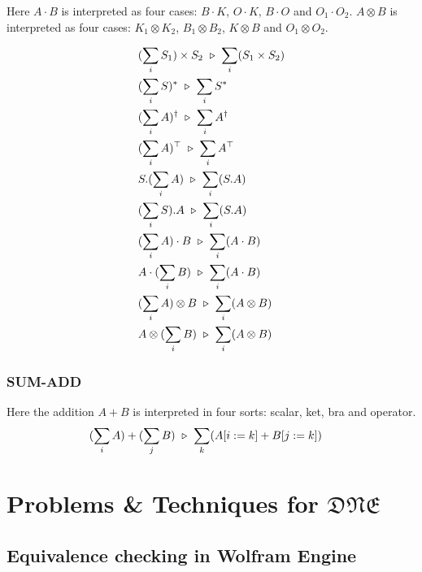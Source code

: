 Here $A \cdot B$ is interpreted as four cases: $B \cdot K$, $O \cdot K$, $B \cdot O$ and $O_1 \cdot O_2$. $A \otimes B$ is interpreted as four cases: $K_1 \otimes K_2$, $B_1 \otimes B_2$, $K \otimes B$ and $O_1 \otimes O_2$.

\begin{align*}
  & (\sum_i S_1) \times S_2 \ \triangleright\  \sum_i (S_1 \times S_2) \\
  & (\sum_i S)^* \ \triangleright\  \sum_i S^* \\
  & (\sum_i A)^\dagger \ \triangleright\  \sum_i A^\dagger \\
  & (\sum_i A)^\top \ \triangleright\  \sum_i A^\top \\
  & S.(\sum_i A) \ \triangleright\  \sum_i (S.A) \\
  & (\sum_i S). A \ \triangleright\  \sum_i (S.A) \\
  & (\sum_i A) \cdot B \ \triangleright\  \sum_i (A \cdot B) \\
  & A \cdot (\sum_i B) \ \triangleright\  \sum_i (A \cdot B) \\
  & (\sum_i A) \otimes B \ \triangleright\  \sum_i (A \otimes B) \\
  & A \otimes (\sum_i B) \ \triangleright\  \sum_i (A \otimes B)
\end{align*}



\subsubsection*{\textsf{SUM-ADD}}
Here the addition $A + B$ is interpreted in four sorts: scalar, ket, bra and operator.
\begin{align*}
  & (\sum_i A) + (\sum_j B) \ \triangleright\  \sum_k (A[i:=k] + B[j:=k])
\end{align*}

\section{Problems \& Techniques for $\mathfrak{DNE}$}

\subsection{Equivalence checking in Wolfram Engine}

